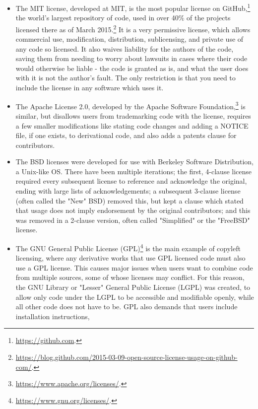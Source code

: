\begin{itemize}
\item The MIT license, developed at MIT, is the most popular license on Git\-Hub,\footnote{\href{https://github.com}{https://github.com}. } the world's largest repository of code, used in over 40\% of the projects licensed there as of March 2015.\footnote{\href{https://blog.github.com/2015-03-09-open-source-license-usage-on-github-com/}{https://blog.github.com/2015-03-09-open-source-license-usage-on-github-com/}. } It is a very permissive license, which allows commercial use, modification, distribution, sublicensing, and private use of any code so licensed. It also waives liability for the authors of the code, saving them from needing to worry about lawsuits in cases where their code would otherwise be liable - the code is granted as is, and what the user does with it is not the author's fault. The only restriction is that you need to include the license in any software which uses it.
\item The Apache License 2.0, developed by the Apache Software Foundation,\footnote{\href{https://www.apache.org/licenses/}{https://www.apache.org/licenses/}. } is similar, but disallows users from trademarking code with the license, requires a few smaller modifications like stating code changes and adding a NOTICE file, if one exists, to derivational code, and also adds a patents clause for contributors.
\item The BSD licenses were developed for use with Berkeley Software Distribution, a Unix-like OS. There have been multiple iterations; the first, 4-clause license required every subsequent license to reference and acknowledge the original, ending with large lists of acknowledgements; a subsequent 3-clause license (often called the "New" BSD) removed this, but kept a clause which stated that usage does not imply endorsement by the original contributors; and this was removed in a 2-clause version, often called "Simplified" or the "FreeBSD" license.
\item The GNU General Public License (GPL)\footnote{\href{https://www.gnu.org/licenses/}{https://www.gnu.org/licenses/}. } is the main example of copyleft licensing, where any derivative works that use GPL licensed code must also use a GPL license. This causes major issues when users want to combine code from multiple sources, some of whose licenses may conflict. For this reason, the GNU Library or "Lesser" General Public License (LGPL) was created, to allow only code under the LGPL to be accessible and modifiable openly, while all other code does not have to be. GPL also demands that users include installation instructions,

\end{itemize}
